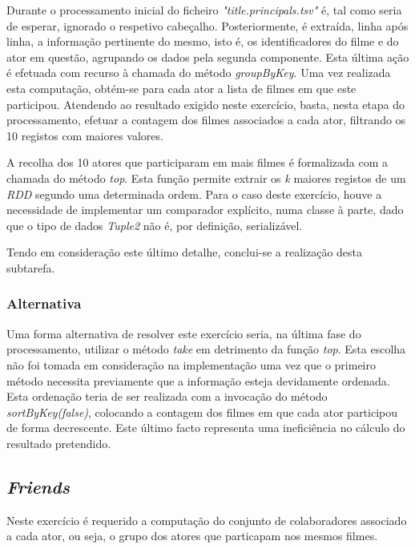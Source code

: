 \documentclass[a4paper]{report}
\begin{document}
{		Durante o processamento inicial do ficheiro \textsl{"title.principals.tsv"} é, tal como seria de esperar, ignorado o respetivo cabeçalho.
		Posteriormente, é extraída, linha após linha, a informação pertinente do mesmo, isto é, os identificadores do filme e do ator em questão, agrupando os dados pela segunda componente. Esta última ação é efetuada com recurso à chamada do método \textit{groupByKey}.
		Uma vez realizada esta computação, obtém-se para cada ator a lista de filmes em que este participou. Atendendo ao resultado exigido neste exercício, basta, nesta etapa do processamento, efetuar a contagem dos filmes associados a cada ator, filtrando os 10 registos com maiores valores.

		A recolha dos 10 atores que participaram em mais filmes é formalizada com a chamada do método \textit{top}. Esta função permite extrair os \textit{k} maiores registos de um \textit{RDD} segundo uma determinada ordem.
		Para o caso deste exercício, houve a necessidade de implementar um comparador explícito, numa classe à parte, dado que o tipo de dados \textit{Tuple2} não é, por definição, serializável.

		Tendo em consideração este último detalhe, conclui-se a realização desta subtarefa.

		\subsubsection{Alternativa} \label{sssec:Task2-Top10-Alternativa}
			Uma forma alternativa de resolver este exercício seria, na última fase do processamento, utilizar o método \textit{take} em detrimento da função \textit{top}.
			Esta escolha não foi tomada em consideração na implementação uma vez que o primeiro método necessita previamente que a informação esteja devidamente ordenada.
			Esta ordenação teria de ser realizada com a invocação do método \textit{sortByKey(false)}, colocando a contagem dos filmes em que cada ator participou de forma decrescente.
			Este último facto representa uma ineficiência no cálculo do resultado pretendido.

	\subsection{\textit{Friends}} \label{subsec:Task2-Friends}
		Neste exercício é requerido a computação do conjunto de colaboradores associado a cada ator, ou seja, o grupo dos atores que particapam nos mesmos filmes.
			
}
\end{document}
